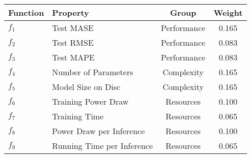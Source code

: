 
    \begin{tabular}{llcc}
        \toprule 
        Function & Property & Group & Weight \\
        \midrule
        $f_{1}$ & Test MASE & Performance & 0.165 \\
        $f_{2}$ & Test RMSE & Performance & 0.083 \\
        $f_{3}$ & Test MAPE & Performance & 0.083 \\
        $f_{4}$ & Number of Parameters & Complexity & 0.165 \\
        $f_{5}$ & Model Size on Disc & Complexity & 0.165 \\
        $f_{6}$ & Training Power Draw & Resources & 0.100 \\
        $f_{7}$ & Training Time & Resources & 0.065 \\
        $f_{8}$ & Power Draw per Inference & Resources & 0.100 \\
        $f_{9}$ & Running Time per Inference & Resources & 0.065 \\
        \bottomrule
    \end{tabular}